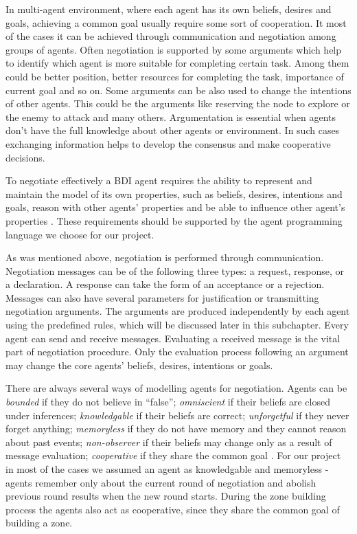 In multi-agent environment, where each agent has its own beliefs, desires and goals, achieving a common goal usually require some sort of cooperation. It most of the cases it can be achieved through communication and negotiation among groups of agents. Often negotiation is supported by some arguments which help to identify which agent is more suitable for completing certain task. Among them could be better position, better resources for completing the task, importance of current goal and so on. Some arguments can be also used to change the intentions of other agents. This could be the arguments like reserving the node to explore or the enemy to attack and many others. Argumentation is essential when agents don't have the full knowledge about other agents or environment. In such cases exchanging information helps to develop the consensus and make cooperative decisions.

To negotiate effectively a BDI agent requires the ability to represent and maintain the model of its own properties, such as beliefs, desires, intentions and goals, reason with other agents' properties and be able to influence other agent's properties \cite{Kraus_98}. These requirements should be supported by the agent programming language we choose for our project. 

As was mentioned above, negotiation is performed through communication. Negotiation messages can be of the following three types: a request, response, or a declaration. A response can take the form of an acceptance or a rejection. Messages can also have several parameters for justification or transmitting negotiation arguments. The arguments are produced independently by each agent using the predefined rules, which will be discussed later in this subchapter. Every agent can send and receive messages. Evaluating a received message is the vital part of negotiation procedure. Only the evaluation process following an argument may change the core agents' beliefs, desires, intentions or goals. 

There are always several ways of modelling agents for negotiation. Agents can be \emph{bounded} if they do not believe in ``false''; \emph{omniscient} if their beliefs are closed under inferences; \emph{knowledgable} if  their beliefs are correct; \emph{unforgetful} if they never forget anything; \emph{memoryless} if they do not have memory and they cannot reason about past events; \emph{non-observer} if their beliefs may change only as a result of message evaluation; \emph{cooperative} if they share the common goal \cite{Kraus_98}. For our project in most of the cases we assumed an agent as knowledgable and memoryless - agents remember only about the current round of negotiation and abolish previous round results when the new round starts. During the zone building process the agents also act as cooperative, since they share the common goal of building a zone.

